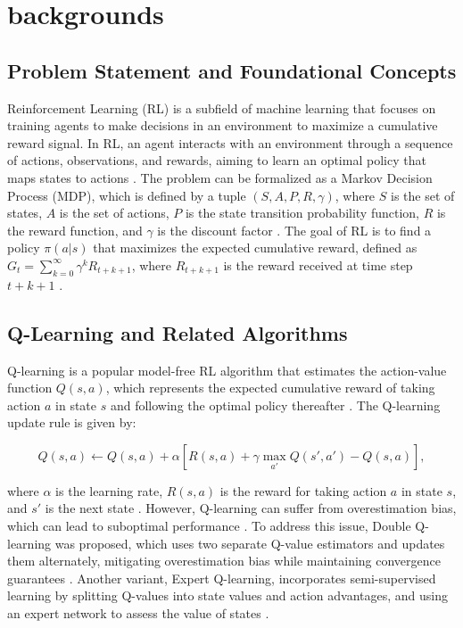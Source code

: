 \section{backgrounds}
\subsection{Problem Statement and Foundational Concepts}

Reinforcement Learning (RL) is a subfield of machine learning that focuses on training agents to make decisions in an environment to maximize a cumulative reward signal. In RL, an agent interacts with an environment through a sequence of actions, observations, and rewards, aiming to learn an optimal policy that maps states to actions \cite{1512.09075}. The problem can be formalized as a Markov Decision Process (MDP), which is defined by a tuple $(S, A, P, R, \gamma)$, where $S$ is the set of states, $A$ is the set of actions, $P$ is the state transition probability function, $R$ is the reward function, and $\gamma$ is the discount factor \cite{1511.02377}. The goal of RL is to find a policy $\pi(a|s)$ that maximizes the expected cumulative reward, defined as $G_t = \sum_{k=0}^{\infty} \gamma^k R_{t+k+1}$, where $R_{t+k+1}$ is the reward received at time step $t+k+1$ \cite{1512.07669}.

\subsection{Q-Learning and Related Algorithms}

Q-learning is a popular model-free RL algorithm that estimates the action-value function $Q(s, a)$, which represents the expected cumulative reward of taking action $a$ in state $s$ and following the optimal policy thereafter \cite{2303.08631}. The Q-learning update rule is given by:

\[Q(s, a) \leftarrow Q(s, a) + \alpha \left[ R(s, a) + \gamma \max_{a'} Q(s', a') - Q(s, a) \right],\]

where $\alpha$ is the learning rate, $R(s, a)$ is the reward for taking action $a$ in state $s$, and $s'$ is the next state \cite{2303.08631}. However, Q-learning can suffer from overestimation bias, which can lead to suboptimal performance \cite{2106.14642}. To address this issue, Double Q-learning was proposed, which uses two separate Q-value estimators and updates them alternately, mitigating overestimation bias while maintaining convergence guarantees \cite{2303.08631}. Another variant, Expert Q-learning, incorporates semi-supervised learning by splitting Q-values into state values and action advantages, and using an expert network to assess the value of states \cite{2106.14642}.

